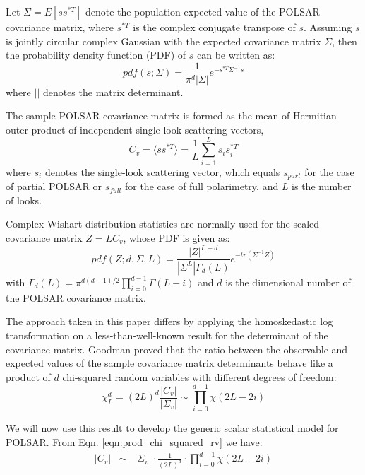 \documentclass[journal]{IEEEtran}
\begin{document}
Let $\Sigma=E [ss^{*T}]$ denote the population expected value of the POLSAR covariance matrix,
  where $s^{*T}$ is the complex conjugate transpose of $s$. 
Assuming %
  $s$ is jointly circular complex Gaussian with the expected covariance matrix $\Sigma$,
  then the probability density function (PDF) of $s$ can be written as:
\begin{equation}
  pdf(s;\Sigma)=\frac{1}{\pi^d|\Sigma|} e^{-s^{*T}\Sigma^{-1}s}
\end{equation}
where $||$ denotes the matrix determinant.

The sample POLSAR covariance matrix is formed as the mean of Hermitian outer product of independent single-look scattering vectors,
\begin{equation}
  C_v = \langle ss^{*T} \rangle = \frac{1}{L} \sum^L_{i=1}s_is_i^{*T}
\end{equation}
where $s_i$ denotes the single-look scattering vector,
  which equals $s_{part}$ for the case of partial POLSAR or
  $s_{full}$ for the case of full polarimetry,
and $L$ is the number of looks.

Complex Wishart distribution statistics are normally used for the scaled covariance matrix
$Z=LC_v$, whose PDF is given as:
\begin{equation}
  pdf(Z;d,\Sigma,L)=\frac{|Z|^{L-d}}{|\Sigma^L|\Gamma_d(L)}e^{-tr(\Sigma^{-1}Z)}
\end{equation}
with $\Gamma_d(L) = \pi^{d(d-1)/2} \prod^{d-1}_{i=0}\Gamma(L-i)$
and $d$ is the dimensional number of the POLSAR covariance matrix.

The approach taken in this paper differs by applying the homoskedastic log transformation  on a less-than-well-known result for the determinant of the covariance matrix.
Goodman \cite{Goodman_1963_AMS_178} proved
that the ratio between the observable and expected values of the sample covariance matrix determinants
  behave like a product of $d$ chi-squared random variables with different degrees of freedom: 
\begin{equation}
\chi^d_L = (2L)^d \frac{|C_v|}{|\Sigma_v|} \sim \prod_{i=0}^{d-1} \chi (2L-2i)
\label{eqn:prod_chi_squared_rv}  
\end{equation}

We will now use this result to develop the generic scalar statistical model for POLSAR. %
From Eqn. \ref{eqn:prod_chi_squared_rv} %
we have: %
\begin{eqnarray}
  |C_v| &\sim& |\Sigma_v| \cdot \frac{1}{(2L)^d} \cdot \prod_{i=0}^{d-1} \chi (2L-2i) \label{eqn:determinant_distribution} %
\end{eqnarray}
\end{document}
